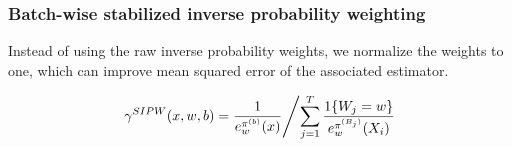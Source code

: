 \documentclass[letterpaper, 12pt, parskip=full,DIV=12]{scrartcl}
\begin{document}
\subsubsection{Batch-wise stabilized inverse probability weighting} \label{appendix:stabilized}
Instead of using the raw inverse probability weights, we normalize the weights to one, which can improve mean squared error of the associated estimator. 

\begin{align}
\left.
\gamma^{SIPW}(x, w, b) = \frac{ 1 }{e_{w}^{\pi^{(b)}}(x)}   
\middle/ 
{ \sum_{j = 1}^T \frac{1\{W_{j} = w\}}{e_{w}^{\pi^{(B_j)}}(X_i)} }
\right.
\end{align}
\end{document}
